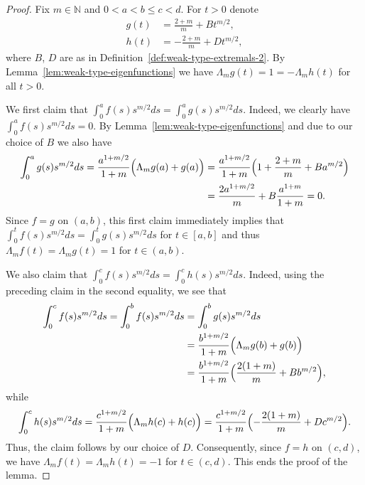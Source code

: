 \documentclass[a4paper]{amsart} %
\theoremstyle{definition}
\theoremstyle{remark}
\numberwithin{equation}{section}
\newcommand*{\NNone}{\mathbb{N}}
\newcommand*{\fZero}{g}
\newcommand*{\fOne}{h}
\newcommand*{\dZero}{B}%
\newcommand*{\dOne}{D}%
\begin{document}
\begin{proof}%
Fix  $m\in\NNone$ and $0<a<b\leq c<d$.
For $t>0$ denote
\begin{align*}
\fZero(t) &=  \frac{2+m}{m} +\dZero t^{m/2},\\
\fOne(t)  &=  -\frac{2+m}{m} + \dOne t^{m/2},
\end{align*}
where $\dZero$, $\dOne$ are as in Definition~\ref{def:weak-type-extremals-2}.
By Lemma~\ref{lem:weak-type-eigenfunctions} we have $\Lambda_m \fZero(t) = 1 = -\Lambda_m \fOne(t)$ for all $t>0$.

We first claim that $\int_0^a f(s) s^{m/2} ds =\int_0^a \fZero(s) s^{m/2} ds$.
Indeed,  we clearly have $\int_0^a f(s) s^{m/2}ds= 0$.
By Lemma~\ref{lem:weak-type-eigenfunctions} and due to our choice of $\dZero$ we also have
\begin{align*}
\int_0^a \fZero(s) s^{m/2} ds
= \frac{a^{1+m/2}}{1+m} \Bigl(\Lambda_m \fZero(a) + \fZero(a) \Bigr)
&= \frac{a^{1+m/2}}{1+m} \Bigl( 1 + \frac{2+m}{m} + \dZero a^{m/2} \Bigr)\\
&= \frac{2 a^{1+m/2}}{m} +\dZero \frac{a^{1+m}}{1+m} = 0.
\end{align*} 	
Since $f=\fZero$ on $(a,b)$, this first  claim immediately implies that $\int_0^t f(s) s^{m/2} ds =\int_0^t \fZero(s) s^{m/2} ds$ for $t\in [a,b]$
and thus $\Lambda_m f(t) = \Lambda_m \fZero(t) = 1$ for $t\in(a,b)$.

We also claim  that $\int_0^c f(s) s^{m/2} ds= \int_0^c \fOne(s) s^{m/2} ds$.
Indeed, using the preceding claim in the second equality,
we see that
\begin{align*}
\int_0^c f(s) s^{m/2} ds
=
\int_0^b f(s) s^{m/2} ds
&=
\int_0^b \fZero(s) s^{m/2} ds\\
&=
\frac{b^{1+m/2}}{1+m} \Bigl(\Lambda_m \fZero(b) + \fZero(b) \Bigr)\\
&=\frac{b^{1+m/2}}{1+m} \Bigl( \frac{2(1+m)}{m} + \dZero b^{m/2} \Bigr),
\end{align*}
while
\begin{align*}
\int_0^c \fOne(s) s^{m/2} ds
=
\frac{c^{1+m/2}}{1+m} \Bigl(\Lambda_m \fOne(c) + \fOne(c) \Bigr)
=\frac{c^{1+m/2}}{1+m} \Bigl( -\frac{2(1+m)}{m} + \dOne c^{m/2} \Bigr).
\end{align*}
Thus, the claim follows by our choice of $\dOne$. %
Consequently, since $f=\fOne$ on $(c,d)$, we have $ \Lambda_m f(t) = \Lambda_m \fOne(t) = -1$ for $t\in(c,d)$. 
This ends the proof of the lemma.
\end{proof}
\end{document}
